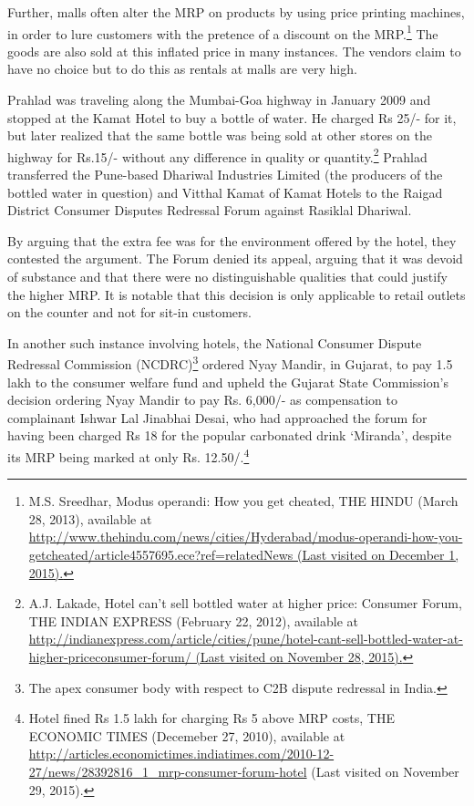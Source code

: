 \begin{multicols}{2}
\vspace{.1cm}

\noi
Further, malls often alter the MRP on products by using price printing machines, in order to
lure customers with the pretence of a discount on the MRP.\footnote{M.S. Sreedhar, Modus operandi: How you get cheated, THE HINDU (March 28, 2013), available at\\  \url{http://www.thehindu.com/news/cities/Hyderabad/modus-operandi-how-you-getcheated/article4557695.ece?ref=relatedNews (Last visited on December 1, 2015).}} The goods are also sold at this
inflated price in many instances. The vendors claim to have no choice but to do this as rentals
at malls are very high.

\vspace{.1cm}

\noi
Prahlad was traveling along the Mumbai-Goa highway in January 2009 and stopped at the
Kamat Hotel to buy a bottle of water. He charged Rs 25/- for it, but later realized that the same
bottle was being sold at other stores on the highway for Rs.15/- without any difference in
quality or quantity.\footnote{ A.J. Lakade, Hotel can’t sell bottled water at higher price: Consumer Forum, THE INDIAN EXPRESS (February 22, 2012), available at \url{http://indianexpress.com/article/cities/pune/hotel-cant-sell-bottled-water-at-higher-priceconsumer-forum/ (Last visited on November 28, 2015).}} Prahlad transferred the Pune-based Dhariwal Industries Limited (the producers of the bottled water in question) and Vitthal Kamat of Kamat Hotels to the Raigad
District Consumer Disputes Redressal Forum against Rasiklal Dhariwal.

\vspace{.1cm}

\noi
By arguing that the extra fee was for the environment offered by the hotel, they contested the
argument. The Forum denied its appeal, arguing that it was devoid of substance and that there
were no distinguishable qualities that could justify the higher MRP. It is notable that this
decision is only applicable to retail outlets on the counter and not for sit-in customers.

\vspace{-.15cm}

\noi
In another such instance involving hotels, the National Consumer Dispute Redressal
Commission (NCDRC)\footnote{The apex consumer body with respect to C2B dispute redressal in India.} ordered Nyay Mandir, in Gujarat, to pay 1.5 lakh to the consumer
welfare fund and upheld the Gujarat State Commission's decision ordering Nyay Mandir to pay
Rs. 6,000/- as compensation to complainant Ishwar Lal Jinabhai Desai, who had approached the forum for having been charged Rs 18 for the popular carbonated drink ‘Miranda', despite
its MRP being marked at only Rs. 12.50/.\footnote{Hotel fined Rs 1.5 lakh for charging Rs 5 above MRP costs, THE ECONOMIC TIMES (Decemeber 27, 2010), available at\\ \url{http://articles.economictimes.indiatimes.com/2010-12-27/news/28392816_1_mrp-consumer-forum-hotel} (Last visited on November 29, 2015).}


\end{multicols}
